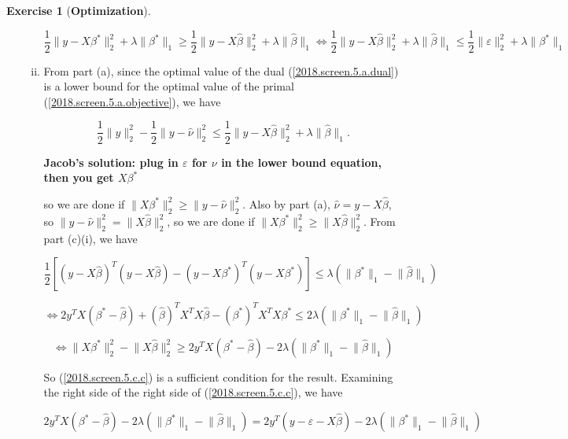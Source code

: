\documentclass{article}
\theoremstyle{definition}
\newtheorem{exercise}{Exercise}
\theoremstyle{definition}
\theoremstyle{definition}
\theoremstyle{definition}
\renewcommand{\epsilon}{\varepsilon}
\renewcommand{\epsilon}{\varepsilon}
\begin{document}
\begin{exercise}[\textbf{Optimization}]
\begin{enumerate}[(a)]
\begin{enumerate}[(i)]
\[
\frac{1}{2} \lVert y - X \beta^* \rVert_2^2 + \lambda \lVert \beta^* \rVert_1 \geq \frac{1}{2} \lVert y - X \hat{\beta} \rVert_2^2 + \lambda \lVert \hat{\beta} \rVert_1 \iff  \frac{1}{2} \lVert y - X \hat{\beta} \rVert_2^2 + \lambda \lVert \hat{\beta} \rVert_1 \leq \frac{1}{2} \lVert\epsilon \rVert_2^2 + \lambda \lVert \beta^* \rVert_1
\]


\item From part (a), since the optimal value of the dual (\ref{2018.screen.5.a.dual}) is a lower bound for the optimal value of the primal (\ref{2018.screen.5.a.objective}), we have

\begin{equation}\label{2018.screen.5.c.d}
 \frac{1}{2} \lVert y \rVert_2^2 - \frac{1}{2} \lVert y - \hat{\nu} \rVert_2^2  \leq \frac{1}{2} \lVert y - X \hat{\beta} \rVert_2^2 + \lambda \lVert \hat{\beta} \rVert_1.
\end{equation}

\textbf{Jacob's solution: plug in \(\epsilon\) for \(\nu\) in the lower bound equation, then you get \(X \beta^*\)}

so we are done if \(\lVert X \beta^* \rVert_2^2 \geq \lVert y - \hat{\nu} \rVert_2^2\). Also by part (a), \(\hat{\nu} = y - X \hat{\beta}\), so \( \lVert y - \hat{\nu} \rVert_2^2 = \lVert X \hat{\beta} \rVert_2^2 \), so we are done if \(\lVert X \beta^* \rVert_2^2 \geq \lVert X \hat{\beta} \rVert_2^2 \). From part (c)(i), we have

\[
 \frac{1}{2}\left[  ( y - X \hat{\beta})^T( y - X \hat{\beta})  - ( y - X \beta^*)^T( y - X \beta^*)  \right] \leq \lambda (\lVert \beta^* \rVert_1 - \lVert \hat{\beta} \rVert_1)
\]

\[
\iff 2 y^T X (\beta^* -  \hat{\beta} ) +  (\hat{\beta})^TX^TX\hat{\beta} - (\beta^*)^TX^TX\beta^* \leq 2\lambda (\lVert \beta^* \rVert_1 - \lVert \hat{\beta} \rVert_1)
\]

\begin{equation}\label{2018.screen.5.c.c}
\iff \lVert X \beta^* \rVert_2^2  -  \lVert X \hat{\beta} \rVert_2^2   \geq  2 y^T X ( \beta^* - \hat{\beta} )  - 2\lambda (\lVert \beta^* \rVert_1 - \lVert \hat{\beta} \rVert_1 ) 
\end{equation}

So (\ref{2018.screen.5.c.c}) is a sufficient condition for the result. Examining the right side of the right side of (\ref{2018.screen.5.c.c}), we have

\begin{equation}\label{2018.screen.5.c.a}
2 y^T X ( \beta^* - \hat{\beta} )  - 2\lambda (\lVert \beta^* \rVert_1 - \lVert \hat{\beta} \rVert_1 ) =  2y^T (y - \epsilon -X \hat{\beta} ) - 2\lambda (\lVert \beta^* \rVert_1 - \lVert \hat{\beta} \rVert_1)  
\end{equation}



\end{enumerate}
\end{enumerate}
\end{exercise}
\end{document}
